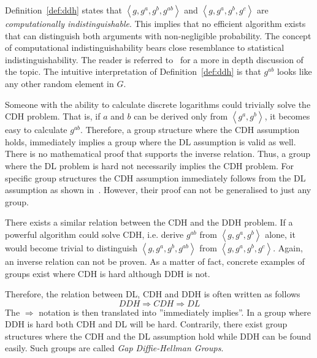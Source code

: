 Definition~\ref{def:ddh} states that $\left< g, g^a, g^b, g^{ab} \right>$ and $\left< g, g^a, g^b, g^{c} \right>$ are \textit{computationally indistinguishable}. This implies that no efficient algorithm exists that can distinguish both arguments with non-negligible probability. The concept of computational indistinguishability bears close resemblance to statistical indistinguishability. The reader is referred to~\cite{art:Goldwasser84,art:Goldwasser89} for a more in depth discussion of the topic. The intuitive interpretation of Definition~\ref{def:ddh} is that $g^{ab}$ looks like any other random element in $G$.

Someone with the ability to calculate discrete logarithms could trivially solve the CDH problem. That is, if $a$ and $b$ can be derived only from $\left< g^a, g^b \right>$, it becomes easy to calculate $g^{ab}$. Therefore, a group structure where the CDH assumption holds, immediately implies a group where the DL assumption is valid as well. There is no mathematical proof that supports the inverse relation. Thus, a group where the DL problem is hard not necessarily implies the CDH problem. For specific group structures the CDH assumption immediately follows from the DL assumption as shown in~\cite{art:MaurerW98,art:MaurerW99}. However, their proof can not be generalised to just any group.

There exists a similar relation between the CDH and the DDH problem. If a powerful algorithm could solve CDH, i.e. derive $g^{ab}$ from $\left< g, g^a, g^b \right>$ alone, it would become trivial to distinguish $\left< g, g^a, g^b, g^{ab} \right>$ from $\left< g, g^a, g^b, g^c \right>$. Again, an inverse relation can not be proven. As a matter of fact, concrete examples of groups exist where CDH is hard although DDH is not.

Therefore, the relation between DL, CDH and DDH is often written as follows
\begin{equation*}
 DDH \Rightarrow CDH \Rightarrow DL
\end{equation*}
The $\Rightarrow$ notation is then translated into ''immediately implies''. In a group where DDH is hard both CDH and DL will be hard. Contrarily, there exist group structures where the CDH and the DL assumption hold while DDH can be found easily. Such groups are called \textit{Gap Diffie-Hellman Groups}.


